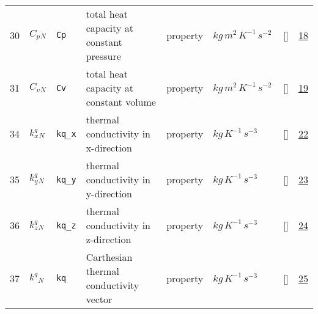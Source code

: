 \begin{longtable}{|p{1cm}|p{3cm}|p{3cm}|p{7cm}|p{3.0cm}|p{3cm}|p{2cm}|p{1cm}|}
                 \\
    30
             & \hypertarget{"v:30"}{ $ {C_p}{_{N}} $}
             & \verb|Cp|
             & total heat capacity at constant pressure
             & \begin{lay}property \end{lay}
             & $ kg \,m^{2} \,K^{-1} \,s^{-2} \, $
             & []
             & \hyperlink{"e:18"}{ 18 }
                 \\
    31
             & \hypertarget{"v:31"}{ $ {C_v}{_{N}} $}
             & \verb|Cv|
             & total heat capacity at constant volume
             & \begin{lay}property \end{lay}
             & $ kg \,m^{2} \,K^{-1} \,s^{-2} \, $
             & []
             & \hyperlink{"e:19"}{ 19 }
                 \\
    34
             & \hypertarget{"v:34"}{ $ {k^q_x}{_{N}} $}
             & \verb|kq_x|
             & thermal conductivity in x-direction
             & \begin{lay}property \end{lay}
             & $ kg \,K^{-1} \,s^{-3} \, $
             & []
             & \hyperlink{"e:22"}{ 22 }
                 \\
    35
             & \hypertarget{"v:35"}{ $ {k^q_y}{_{N}} $}
             & \verb|kq_y|
             & thermal conductivity in y-direction
             & \begin{lay}property \end{lay}
             & $ kg \,K^{-1} \,s^{-3} \, $
             & []
             & \hyperlink{"e:23"}{ 23 }
                 \\
    36
             & \hypertarget{"v:36"}{ $ {k^q_z}{_{N}} $}
             & \verb|kq_z|
             & thermal conductivity in z-direction
             & \begin{lay}property \end{lay}
             & $ kg \,K^{-1} \,s^{-3} \, $
             & []
             & \hyperlink{"e:24"}{ 24 }
                 \\
    37
             & \hypertarget{"v:37"}{ $ {k^q}{_{N}} $}
             & \verb|kq|
             & Carthesian thermal conductivity vector
             & \begin{lay}property \end{lay}
             & $ kg \,K^{-1} \,s^{-3} \, $
             & []
             & \hyperlink{"e:25"}{ 25 }
                 \\

\end{longtable}
